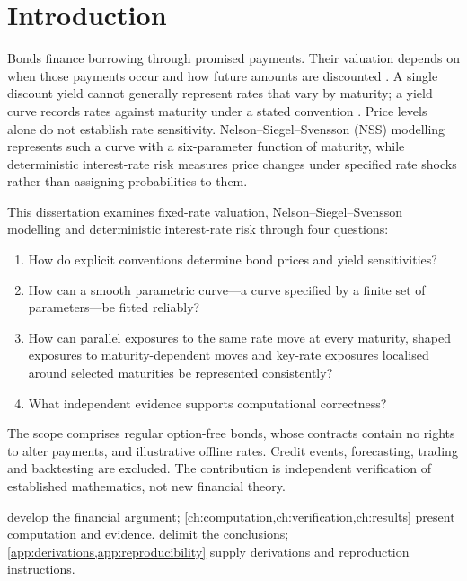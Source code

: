 \chapter{Introduction}\label{ch:introduction}
Bonds finance borrowing through promised payments. Their valuation depends on when those payments occur and how future amounts are discounted \parencite{tuckman2011}. A single discount yield cannot generally represent rates that vary by maturity; a yield curve records rates against maturity under a stated convention \parencite{tuckman2011}. Price levels alone do not establish rate sensitivity. Nelson--Siegel--Svensson (NSS) modelling represents such a curve with a six-parameter function of maturity, while deterministic interest-rate risk measures price changes under specified rate shocks rather than assigning probabilities to them.

This dissertation examines fixed-rate valuation, Nelson--Siegel--Svensson modelling and deterministic interest-rate risk through four questions:
\begin{enumerate}
\item\label{rq:bond} How do explicit conventions determine bond prices and yield sensitivities?
\item\label{rq:nss} How can a smooth parametric curve---a curve specified by a finite set of parameters---be fitted reliably?
\item\label{rq:risk} How can parallel exposures to the same rate move at every maturity, shaped exposures to maturity-dependent moves and key-rate exposures localised around selected maturities be represented consistently?
\item\label{rq:verification} What independent evidence supports computational correctness?
\end{enumerate}
The scope comprises regular option-free bonds, whose contracts contain no rights to alter payments, and illustrative offline rates. Credit events, forecasting, trading and backtesting are excluded. The contribution is independent verification of established mathematics, not new financial theory.

 develop the financial argument; \cref{ch:computation,ch:verification,ch:results} present computation and evidence.  delimit the conclusions; \cref{app:derivations,app:reproducibility} supply derivations and reproduction instructions.
